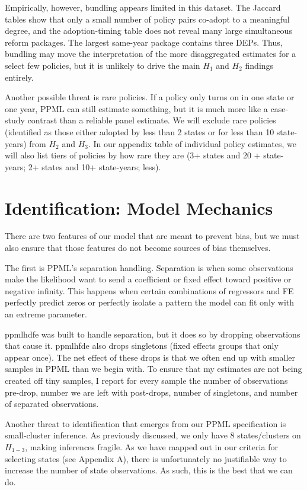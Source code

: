\documentclass[doublespace,nopageskip]{UVAthesis}
\begin{document}
Empirically, however, bundling appears limited in this dataset. The Jaccard tables show that only a small number of policy pairs co-adopt to a meaningful degree, and the adoption-timing table does not reveal many large simultaneous reform packages. The largest same-year package contains three DEPs. Thus, bundling may move the interpretation of the more disaggregated estimates for a select few policies, but it is unlikely to drive the main $H_1$ and $H_2$ findings entirely.



Another possible threat is rare policies. If a policy only turns on in one state or one year, PPML can still estimate something, but it is much more like a case-study contrast than a reliable panel estimate. We will exclude rare policies (identified as those either adopted by less than 2 states or for less than 10 state-years) from $H_2$ and $H_3$. In our appendix table of individual policy estimates, we will also list tiers of policies by how rare they are (3+ states and 20 + state-years; 2+ states and 10+ state-years; less).

\section{Identification: Model Mechanics } \label{ss: model mechanics}

There are two features of our model that are meant to prevent bias, but we must also ensure that those features do not become sources of bias themselves.

The first is PPML's separation handling. Separation is when some observations make the likelihood want to send a coefficient or fixed effect toward positive or negative infinity. This happens when certain combinations of regressors and FE perfectly predict zeros or perfectly isolate a pattern the model can fit only with an extreme parameter. 

ppmlhdfe was built to handle separation, but it does so by dropping observations that cause it. ppmlhfde also drops singletons (fixed effects groups that only appear once). The net effect of these drops is that we often end up with smaller samples in PPML than we begin with. To ensure that my estimates are not being created off tiny samples, I report for every sample the number of observations pre-drop, number we are left with post-drops, number of singletons, and number of separated observations.

Another threat to identification that emerges from our PPML specification is small-cluster inference. As previously discussed, we only have 8 states/clusters on $H_{1-3}$, making inferences fragile. As we have mapped out in our criteria for selecting states (see Appendix A), there is unfortunately no justifiable way to increase the number of state observations. As such, this is the best that we can do.
\end{document}
